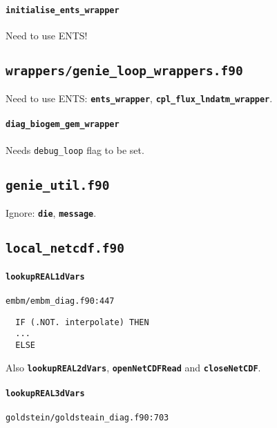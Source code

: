 \documentclass[a4paper,10pt,article]{memoir}
\begin{document}
\paragraph{\texttt{initialise\_ents\_wrapper}}

Need to use ENTS!


\subsection*{\texttt{wrappers/genie\_loop\_wrappers.f90}}

Need to use ENTS: \textbf{\texttt{ents\_wrapper}},
\textbf{\texttt{cpl\_flux\_lndatm\_wrapper}}.

\paragraph{\texttt{diag\_biogem\_gem\_wrapper}}

Needs \texttt{debug\_loop} flag to be set.


\subsection*{\texttt{genie\_util.f90}}

Ignore: \textbf{\texttt{die}}, \textbf{\texttt{message}}.


\subsection*{\texttt{local\_netcdf.f90}}

\paragraph{\texttt{lookupREAL1dVars}}

\texttt{embm/embm\_diag.f90:447}

\begin{verbatim}
  IF (.NOT. interpolate) THEN
  ...
  ELSE
\end{verbatim}

Also \textbf{\texttt{lookupREAL2dVars}},
\textbf{\texttt{openNetCDFRead}} and \textbf{\texttt{closeNetCDF}}.

\paragraph{\texttt{lookupREAL3dVars}}

\texttt{goldstein/goldsteain\_diag.f90:703}
\end{document}
